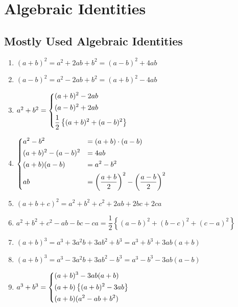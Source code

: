 \chapter{Algebraic Identities}

\vspace*{-1cm}
\section{Mostly Used Algebraic Identities}

\begin{formulasheet}
\begin{enumerate}
	\item $(a+b)^2= a^2+2ab+b^2 = (a-b)^2+4ab$
	\item $(a-b)^2= a^2-2ab+b^2 = (a+b)^2-4ab$
	\item $a^2+b^2= \begin{dcases}
		(a+b)^2-2ab & \\
		(a-b)^2+2ab & \\
		\dfrac{1}{2}\left\{ (a+b)^2+(a-b)^2\right\} & \\
	\end{dcases}$
	\item $\begin{dcases}
		a^2-b^2 &=  (a+b)\cdot(a-b) \\
		(a+b)^2-(a-b)^2 &= 4ab \\
		(a+b)(a-b) &= a^2-b^2 \\
		ab &= \left(\dfrac{a+b}{2}\right)^2- \left(\dfrac{a-b}{2}\right)^2\\
	\end{dcases}$
	\item $(a+b+c)^2=a^2+b^2+c^2+2ab+2bc+2ca$
	\item $a^2+b^2+c^2-ab-bc-ca= \dfrac{1}{2} \left\{(a-b)^2+(b-c)^2+(c-a)^2\right\}$
	\item $(a+b)^3=a^3+3a^2b+3ab^2+b^3 = a^3+b^3+3ab(a+b)$
	\item $(a+b)^3=a^3-3a^2b+3ab^2-b^3 = a^3-b^3-3ab(a-b)$
	\item $a^3+b^3= \begin{dcases}
		(a+b)^3-3ab(a+b) & \\
		(a+b)\left\{(a+b)^2-3ab\right\}& \\
		(a+b)(a^2-ab+b^2) &\\
	\end{dcases}$

\end{enumerate}
\end{formulasheet}
